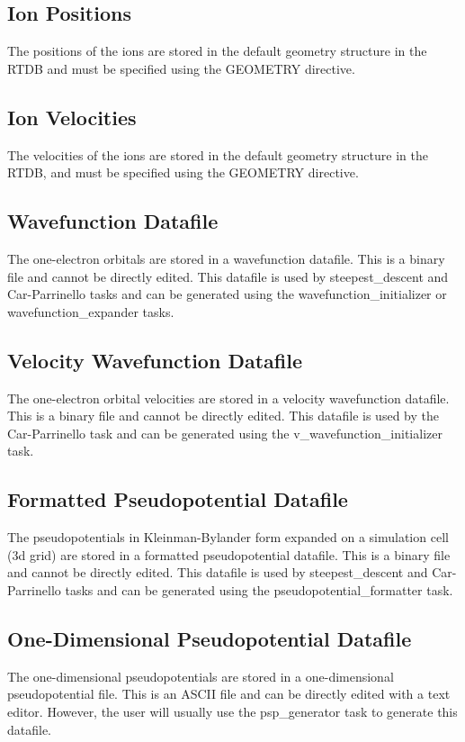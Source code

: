 \subsection{Ion Positions}
The positions of the ions are stored in the default geometry structure
in the RTDB and must be specified  using the GEOMETRY directive.

\subsection{Ion Velocities}
The velocities of the ions are stored in the default geometry structure
in the RTDB, and must be specified using the GEOMETRY directive.



\subsection{Wavefunction Datafile}
The one-electron orbitals are stored in a wavefunction datafile.  This
is a binary file and cannot be directly edited.  This datafile is used
by steepest\_descent and Car-Parrinello tasks and can be generated
using the wavefunction\_initializer or wavefunction\_expander tasks.

\subsection{Velocity Wavefunction Datafile}
The one-electron orbital velocities are stored in a velocity wavefunction 
datafile.  This is a binary file and cannot be directly edited.  This datafile 
is used by the Car-Parrinello task and can be generated
using the v\_wavefunction\_initializer task.

\subsection{Formatted Pseudopotential Datafile}
The pseudopotentials in Kleinman-Bylander form expanded on a simulation
cell (3d grid) are stored in a formatted pseudopotential datafile.
This is a binary file and cannot be directly edited.
This datafile 
is used by steepest\_descent and Car-Parrinello tasks and can be generated
using the pseudopotential\_formatter task.

\subsection{One-Dimensional Pseudopotential Datafile}
The one-dimensional pseudopotentials are stored in a one-dimensional 
pseudopotential file.  This is an ASCII file and can be directly edited with
a text editor.  However, the user will usually use the psp\_generator
task to generate this datafile.

